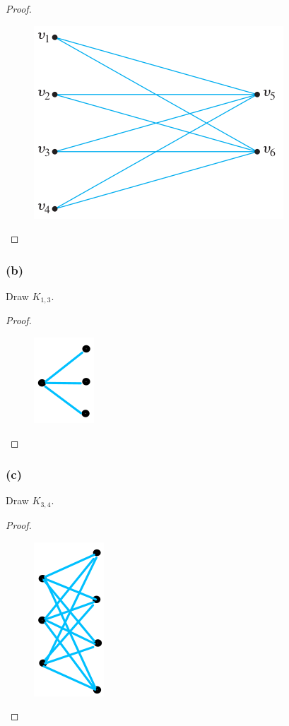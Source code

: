 \documentclass[14pt]{extarticle}
\begin{document}
\begin{proof}
\begin{figure}[ht!]
\centering
\includegraphics[scale=0.4]{../images/4.9.23.a.png}
\end{figure}
\end{proof}

\subsubsection{(b)}
Draw $K_{1,3}$.

\begin{proof}
\begin{figure}[ht!]
\centering
\includegraphics[scale=0.5]{../images/4.9.23.b.png}
\end{figure}
\end{proof}

\subsubsection{(c)}
Draw $K_{3,4}$.

\begin{proof}
\begin{figure}[ht!]
\centering
\includegraphics[scale=0.5]{../images/4.9.23.c.png}
\end{figure}
\end{proof}
\end{document}
